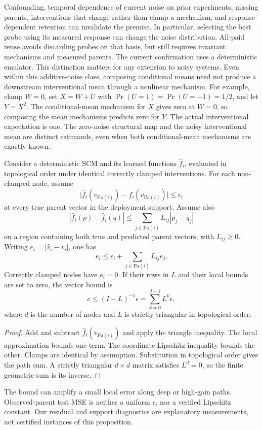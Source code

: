 Confounding, temporal dependence of current noise on prior experiments,
missing parents, interventions that change rather than clamp a
mechanism, and response-dependent retention can invalidate the premise. In
particular, selecting the best probe using its measured response can change
the noise distribution. All-paid reuse avoids discarding probes on that basis,
but still requires invariant mechanisms and measured parents. The current
confirmation uses a deterministic emulator. This distinction matters for
any extension to noisy systems. Even within this additive-noise class,
composing conditional means need not produce a
downstream interventional mean through a nonlinear mechanism.
For example, clamp $W=0$, set $X=W+U$ with
$\Pr(U=1)=\Pr(U=-1)=1/2$, and let $Y=X^2$. The conditional-mean mechanism
for $X$ gives zero at $W=0$, so composing the mean mechanisms predicts zero
for $Y$. The actual interventional expectation is one. The zero-noise
structural map and the noisy interventional mean are distinct estimands,
even when both conditional-mean mechanisms are exactly known.

\begin{proposition}
Consider a deterministic SCM and its learned functions $\hat f_i$, evaluated
in topological order under identical correctly clamped interventions.
For each non-clamped node, assume
\[
 \bigl|\hat f_i(v_{\mathrm{Pa}(i)})-f_i(v_{\mathrm{Pa}(i)})\bigr|
 \leq\epsilon_i
\]
at every true parent vector in the deployment support. Assume also
\[
 |\hat f_i(p)-\hat f_i(q)|\leq
 \sum_{j\in\mathrm{Pa}(i)}L_{ij}|p_j-q_j|
\]
on a region containing both true and predicted parent vectors, with
$L_{ij}\geq0$. Writing $e_i=|\hat v_i-v_i|$, one has
\[
 e_i\leq\epsilon_i+\sum_{j\in\mathrm{Pa}(i)}L_{ij}e_j.
\]
Correctly clamped nodes have $e_i=0$. If their rows in $L$ and their local
bounds are set to zero, the vector bound is
\[
 e\leq(I-L)^{-1}\epsilon=\sum_{k=0}^{d-1}L^k\epsilon,
\]
where $d$ is the number of nodes and $L$ is strictly triangular in topological
order.
\end{proposition}
\begin{proof}
Add and subtract $\hat f_i(v_{\mathrm{Pa}(i)})$ and apply the triangle
inequality. The local approximation bounds one term. The coordinate Lipschitz
inequality bounds the other. Clamps are identical by assumption. Substitution
in topological order gives the path sum. A strictly triangular $d\times d$
matrix satisfies $L^d=0$, so the finite geometric sum is its inverse.
\end{proof}
The bound can amplify a small local error along deep or high-gain paths.
Observed-parent test MSE is neither a uniform $\epsilon_i$ nor a verified
Lipschitz constant. Our residual and support diagnostics are explanatory
measurements, not certified instances of this proposition.

